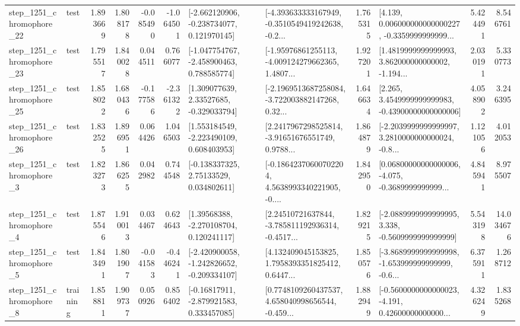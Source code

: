 \begin{tabular}{llrrrrllrlrr}
 step\_1251\_chromophore\_22 &      test &      1.893669 &    1.808178 &     -0.085490 & -1.064501 &   [-2.662120906, -0.238734077, 0.121970145] &  [-4.393633333167949, -0.3510549419242638, -0.2... &       1.765315 &  [4.139, 0.006000000000000227, -0.3359999999999... &            5.424491 &          8.546761 \\
 step\_1251\_chromophore\_23 &      test &      1.795517 &    1.840028 &      0.044511 &  0.766077 &   [-1.047754767, -2.458900463, 0.788585774] &  [-1.95976861255113, -4.009124279662365, 1.4807... &       1.927201 &  [1.4819999999999993, 3.862000000000002, -1.194... &            2.030191 &          5.330773 \\
 step\_1251\_chromophore\_25 &      test &      1.858022 &    1.680436 &     -0.177586 & -2.361322 &     [1.309077639, 2.33527685, -0.329033794] &  [-2.1969513687258084, -3.722003882147268, 0.32... &       1.646634 &  [2.265, 3.4549999999999983, -0.43900000000000006] &            4.058902 &          3.246395 \\
 step\_1251\_chromophore\_26 &      test &      1.832525 &    1.896951 &      0.064426 &  1.046503 &    [1.553184549, -2.223490109, 0.608403953] &  [2.2417967298525814, -3.91651676551749, 0.9788... &       1.864879 &  [-2.2039999999999997, 3.2810000000000024, -0.8... &            1.121056 &          4.012053 \\
  step\_1251\_chromophore\_3 &      test &      1.823273 &    1.866255 &      0.042982 &  0.744548 &     [-0.138337325, 2.75133529, 0.034802611] &  [-0.18642370600702204, 4.5638993340221905, -0.... &       1.842950 &  [0.06800000000000006, -4.075, -0.3689999999999... &            4.845941 &          8.975507 \\
  step\_1251\_chromophore\_4 &      test &      1.875546 &    1.910013 &      0.034467 &  0.624643 &     [1.39568388, -2.270108704, 0.120241117] &  [2.24510721637844, -3.785811192936314, -0.4517... &       1.829215 &  [-2.0889999999999995, 3.338, -0.5609999999999999] &            5.543198 &         14.034676 \\
  step\_1251\_chromophore\_5 &      test &      1.843491 &    1.801907 &     -0.041583 & -0.446241 &  [-2.420900058, -1.242826652, -0.209334107] &  [4.132409045153825, 1.7958393351825412, 0.6447... &       1.850576 &  [-3.8689999999999998, -1.653999999999999, -0.6... &            6.375911 &          1.268712 \\
  step\_1251\_chromophore\_8 &  training &      1.858811 &    1.909737 &      0.050926 &  0.856402 &    [-0.16817911, -2.879921583, 0.333457085] &  [0.7748109260437537, 4.658040998656544, -0.459... &       1.882949 &  [-0.5600000000000023, -4.191, 0.42600000000000... &            4.326249 &          1.835268 \\

\end{tabular}
